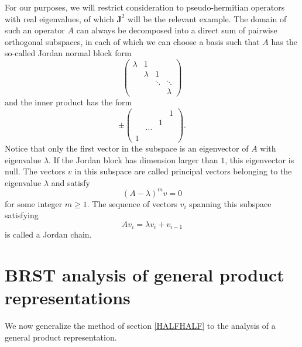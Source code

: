 \documentclass[a4paper,dvips,12pt]{article}
\begin{document}
    For our purposes, we will restrict consideration to
    pseudo-hermitian operators with real eigenvalues, of which $\mathbf{J}^2$
    will be the relevant example.  The domain
    of such an operator $A$ can always be decomposed into a direct sum
    of pairwise orthogonal subspaces, in each of which
    we can choose a basis such that $A$ has the
    so-called Jordan normal block form
    \begin{equation}
        \left(
            \begin{array}{cccc}
                \lambda & 1       &        &        \\
                        & \lambda & 1      &        \\
                        &         & \ddots & \ddots \\
                        &         &        & \lambda
            \end{array}
        \right) \label{JORDAN}
    \end{equation}
    and the inner product has the form
    \begin{equation}
        \pm\left(
            \begin{array}{cccc}
                 &        &        & 1       \\
                &         & 1      &        \\
                & \cdots         &        &        \\
                1        &         &        &
            \end{array}
        \right). \label{GRAM}
    \end{equation}
    Notice that only the first vector in the subspace is an
    eigenvector of $A$ with eigenvalue $\lambda$.
    If the Jordan block has dimension
    larger than $1$, this eigenvector is null.
    The vectors $v$ in this subspace are
    called principal vectors belonging to the eigenvalue $\lambda$ and
    satisfy
    \[
        (A - \lambda)^m v = 0
    \]
    for some integer $m \ge 1$.  The sequence of vectors $v_i$ spanning
    this subspace satisfying
    \[
        A v_{i} = \lambda v_i + v_{i-1}
    \]
    is called a Jordan chain.

    \section{BRST analysis of general product representations}

    We now generalize the method of section \ref{HALFHALF} to
    the analysis of a general product representation.
\end{document}
